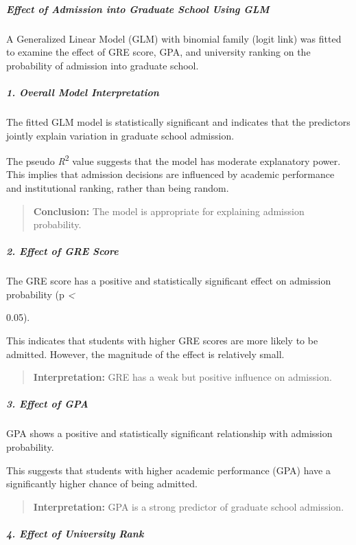 \subparagraph{Effect of Admission into Graduate School Using
GLM}\label{effect-of-admission-into-graduate-school-using-glm}

A Generalized Linear Model (GLM) with binomial family (logit link) was
fitted to examine the effect of GRE score, GPA, and university ranking
on the probability of admission into graduate school.

\subparagraph{1. Overall Model
Interpretation}\label{overall-model-interpretation}

The fitted GLM model is statistically significant and indicates that the
predictors jointly explain variation in graduate school admission.

The pseudo \emph{R}\textsuperscript{2} value suggests that the model has
moderate explanatory power. This implies that admission decisions are
influenced by academic performance and institutional ranking, rather
than being random.

\begin{quote}
\textbf{Conclusion:} The model is appropriate for explaining admission
probability.
\end{quote}

\subparagraph{2. Effect of GRE Score}\label{effect-of-gre-score}

The GRE score has a positive and statistically significant effect on
admission probability (p \emph{\textless{}}

0.05).

This indicates that students with higher GRE scores are more likely to
be admitted. However, the magnitude of the effect is relatively small.

\begin{quote}
\textbf{Interpretation:} GRE has a weak but positive influence on
admission.
\end{quote}

\subparagraph{3. Effect of GPA}\label{effect-of-gpa}

GPA shows a positive and statistically significant relationship with
admission probability.

This suggests that students with higher academic performance (GPA) have
a significantly higher chance of being admitted.

\begin{quote}
\textbf{Interpretation:} GPA is a strong predictor of graduate school
admission.
\end{quote}

\subparagraph{4. Effect of University
Rank}\label{effect-of-university-rank}

